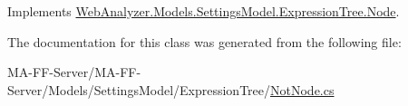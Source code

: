 Implements \hyperlink{class_web_analyzer_1_1_models_1_1_settings_model_1_1_expression_tree_1_1_node_a5cf0b866812c017ef1d0feb5f594499e}{Web\+Analyzer.\+Models.\+Settings\+Model.\+Expression\+Tree.\+Node}.



The documentation for this class was generated from the following file\+:\begin{DoxyCompactItemize}
\item 
M\+A-\/\+F\+F-\/\+Server/\+M\+A-\/\+F\+F-\/\+Server/\+Models/\+Settings\+Model/\+Expression\+Tree/\hyperlink{_not_node_8cs}{Not\+Node.\+cs}\end{DoxyCompactItemize}
